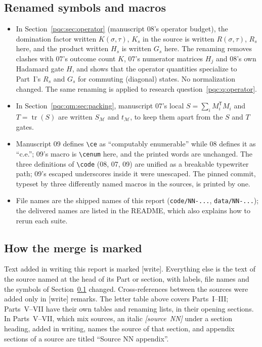 \documentclass[11pt,letterpaper]{article}
\numberwithin{equation}{section}
\theoremstyle{definition}
\theoremstyle{remark}
\newcommand{\code}[1]{\nolinkurl{#1}}
\newcommand{\wtag}{\textup{[write]}}
\newcommand{\ce}{c.e.}
\newcommand{\tr}{\operatorname{tr}}
\newcommand{\cenum}{computably enumerable}
\begin{document}
\subsection{Renamed symbols and macros}
\label{pqc:conv:renames}
\begin{itemize}
\item In Section~\ref{pqc:sec:operator} (manuscript 08's operator budget), the
domination factor written $K(\sigma,\tau)$, $K_s$ in the source is written
$R(\sigma,\tau)$, $R_s$ here, and the product written $H_s$ is written $G_s$
here. The renaming removes clashes with 07's outcome count $K$, 07's
numerator matrices $H_j$ and 08's own Hadamard gate $H$, and shows that the
operator quantities specialize to Part~I's $R_s$ and $G_s$ for commuting
(diagonal) states. No normalization changed. The same renaming is applied to
research question~\ref{pqc:q:operator}.
\item In Section~\ref{pqc:qm:sec:packing}, manuscript 07's local
$S=\sum_iM_i^{\mathsf T}M_i$ and $T=\tr(S)$ are written $S_{\mathcal M}$ and
$t_{\mathcal M}$, to keep them apart from the $S$ and $T$ gates.
\item Manuscript 09 defines \verb|\ce| as ``computably enumerable'' while 08
defines it as ``c.e.''; 09's macro is \verb|\cenum| here, and the printed
words are unchanged. The three definitions of \verb|\code| (08, 07, 09) are
unified as a breakable typewriter path; 09's escaped underscores inside it
were unescaped. The pinned commit, typeset by three differently named
macros in the sources, is printed by one.
\item File names are the shipped names of this report
(\code{code/NN-...}, \code{data/NN-...}); the delivered names are listed in
the README, which also explains how to rerun each suite.
\end{itemize}

\subsection{How the merge is marked}
Text added in writing this report is marked \wtag. Everything else is the
text of the source named at the head of its Part or section, with labels,
file names and the symbols of Section~\ref{pqc:conv:renames} changed.
Cross-references between the sources were added only in \wtag{} remarks.
The letter table above covers Parts~I--III; Parts~V--VII have their own tables
and renaming lists, in their opening sections. In Parts~V--VII, which mix
sources, an italic \emph{[source~NN]} under a section heading, added in
writing, names the source of that section, and appendix sections of a source
are titled ``Source NN appendix''.
\end{document}
